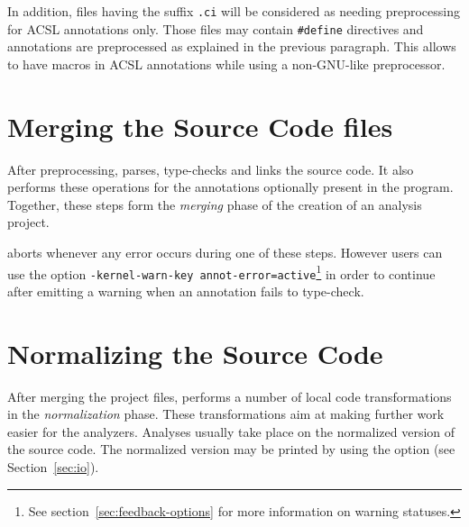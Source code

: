 In addition, files having the suffix \texttt{.ci} will be considered as needing
preprocessing for ACSL annotations only. Those files may contain
\texttt{\#define} directives and annotations are preprocessed as explained in
the previous paragraph. This allows to have macros in ACSL annotations while
using a non-GNU-like preprocessor.

\section{Merging the Source Code files}

After preprocessing, \FramaC parses, type-checks and links the source
code.  It also performs these operations for the \acsl annotations
optionally present in the program. Together, these steps form the
\emph{merging} phase of the creation of an analysis project.

\FramaC aborts whenever any error occurs during one of these steps. However
users can use the option
\texttt{-kernel-warn-key annot-error=active}\footnote{%
See section~\ref{sec:feedback-options} for more information on warning statuses.}
in order to
continue after emitting a warning when an \acsl annotation fails to type-check.

\section{Normalizing the Source Code}\label{sec:normalize}

After merging the project files, \FramaC performs
a number of local code transformations in the \emph{normalization} phase.
These transformations aim at making further work easier for the analyzers.
Analyses usually take place on the normalized version of the source code.
The normalized version may be printed by using
the option  (see Section~\ref{sec:io}).

